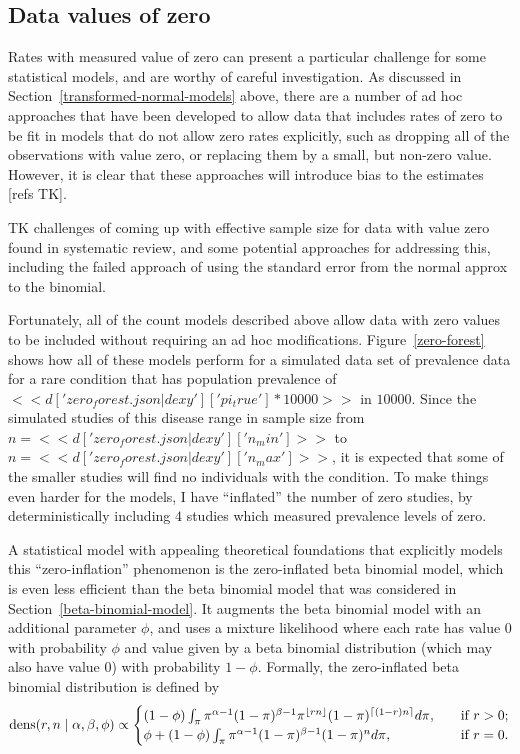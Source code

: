 \subsection{Data values of zero}
Rates with measured value of zero can present a particular challenge
for some statistical models, and are worthy of careful investigation.
As discussed in Section~\ref{transformed-normal-models} above, there
are a number of ad hoc approaches that have been developed to allow
data that includes rates of zero to be fit in models that do not allow
zero rates explicitly, such as dropping all of the observations with
value zero, or replacing them by a small, but non-zero value.
However, it is clear that these approaches will introduce bias to the
estimates [refs TK].

TK challenges of coming up with effective sample size for data with
value zero found in systematic review, and some potential approaches
for addressing this, including the failed approach of using the
standard error from the normal approx to the binomial.

Fortunately, all of the count models described above allow data with
zero values to be included without requiring an ad hoc modifications.
Figure~\ref{zero-forest} shows how all of these models perform for a
simulated data set of prevalence data for a rare condition that has
population prevalence of
$<<d['zero_forest.json|dexy']['pi_true']*10000>>$ in $10000$.  Since
the simulated studies of this disease range in sample size from
$n=<<d['zero_forest.json|dexy']['n_min']>>$ to
$n=<<d['zero_forest.json|dexy']['n_max']>>$, it is expected that some
of the smaller studies will find no individuals with the condition.
To make things even harder for the models, I have ``inflated'' the
number of zero studies, by deterministically including $4$ studies
which measured prevalence levels of zero.

A statistical model with appealing theoretical foundations that
explicitly models this ``zero-inflation'' phenomenon is the
zero-inflated beta binomial model, which is even less efficient than
the beta binomial model that was considered in
Section~\ref{beta-binomial-model}.  It augments the beta binomial
model with an additional parameter $\phi$, and uses a mixture
likelihood where each rate has value $0$ with probability $\phi$ and
value given by a beta binomial distribution (which may also have value
$0$) with probability $1-\phi$.  Formally, the zero-inflated beta
binomial distribution is defined by
\[
\operatorname{dens}(r,n\;|\; \alpha, \beta, \phi) \propto \begin{cases}
(1-\phi)\int_{\pi}
\pi^{\alpha-1}(1-\pi)^{\beta-1} \pi^{\lfloor rn\rfloor}
(1-\pi)^{\lceil (1-r)n\rceil}
d\pi, &\quad\text{if } r > 0;
\\
\phi + (1-\phi)\int_{\pi}
\pi^{\alpha-1}(1-\pi)^{\beta-1}
(1-\pi)^{n}
d\pi, &\quad\text{if } r = 0.
\end{cases}
\]

